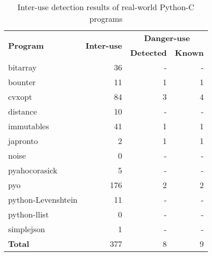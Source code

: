 \begin{table}[t]
\caption{Inter-use detection results of real-world Python-C programs}
\label{table:RQ2-2}
\vspace*{-.5em}
\centering
\begin{tabular}{l||r|r|r}
\multirow{2}{*}{\textbf{Program}} & \multirow{2}{*}{\textbf{Inter-use}} & \multicolumn{2}{c}{\textbf{Danger-use}} \\
\hhline{~||~|-|-}
                                  &                                     & \textbf{Detected} & \textbf{Known}      \\
\hhline{=#=|=|=}
bitarray                          & 36                                  & -                 & -                   \\
bounter                           & 11                                  & 1                 & 1                   \\
cvxopt                            & 84                                  & 3                 & 4                   \\
distance                          & 10                                  & -                 & -                   \\
immutables                        & 41                                  & 1                 & 1                   \\
japronto                          & 2                                   & 1                 & 1                   \\
noise                             & 0                                   & -                 & -                   \\
pyahocorasick                     & 5                                   & -                 & -                   \\
pyo                               & 176                                 & 2                 & 2                   \\
python-Levenshtein                & 11                                  & -                 & -                   \\
python-llist                      & 0                                   & -                 & -                   \\
simplejson                        & 1                                   & -                 & -                   \\
\hhline{=#=|=|=}
\textbf{Total}     & 377       & 8 & 9
\end{tabular}
\end{table}
